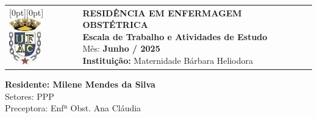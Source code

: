 \begin{flushleft}
    \begin{tabular}{@{}l l@{}}
        \raisebox{0pt}[0pt][0pt]{\includegraphics[height=2cm]{escala/recursos/ufac-logo.jpeg}} &
        \parbox[b][2cm][t]{0.82\linewidth}{
            \raggedright
            {\fontsize{11pt}{13pt}\selectfont
                \textbf{RESIDÊNCIA EM ENFERMAGEM OBSTÉTRICA} \\
                \textbf{Escala de Trabalho e Atividades de Estudo} \\
                Mês: \textbf{Junho / 2025} \\
                \textbf{Instituição:} Maternidade Bárbara Heliodora
            }
        }
    \end{tabular}

    {\fontsize{12pt}{14pt}\selectfont
        \textbf{Residente: Milene Mendes da Silva} \\
        Setores: PPP\\
        Preceptora: Enfª Obst. Ana Cláudia
    }
\end{flushleft}